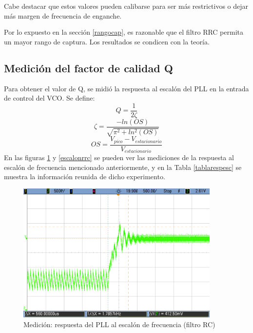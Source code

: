 Cabe destacar que estos valores pueden calibarse para ser más restrictivos o dejar más margen de frecuencia de enganche.

Por lo expuesto en la sección \ref{rangocap}, es razonable que el filtro RRC permita un mayor rango de captura. Los resultados se condicen con la teoría.

\subsection{Medición del factor de calidad Q}
Para obtener el valor de Q, se midió la respuesta al escalón del PLL en la entrada de control del VCO. Se define:
\begin{equation}
    Q=\frac{1}{2\zeta}
\end{equation}
\begin{equation}
    \zeta=\frac{-ln(OS)}{\sqrt{\pi^2+ln^2(OS)}}
\end{equation}
\begin{equation}
    OS=\frac{V_{pico}-V_{estacionario}}{V_{estacionario}}
\end{equation}
En las figuras \ref{escalonrc} y \ref{escalonrrc} se pueden ver las mediciones de la respuesta al escalón de frecuencia mencionado anteriormente, y en la Tabla \ref{tablarespesc} se muestra la información reunida de dicho experimento.


\begin{figure}[H]
    \centering
    \includegraphics[width=0.9\textwidth]{../Ex2/resources/escalonrc.png}
    \caption{Medición: respuesta del PLL al escalón de frecuencia (filtro RC)}
    \label{escalonrc}
\end{figure}

